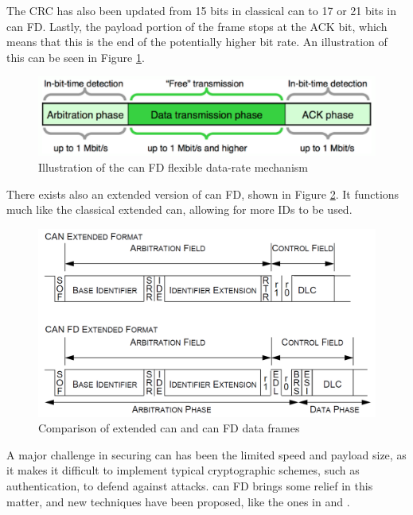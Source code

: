 The CRC has also been updated from 15 bits in classical \gls{can} to 17 or 21 bits in \gls{can} FD. Lastly, the payload portion of the frame stops at the ACK bit, which means that this is the end of the potentially higher bit rate. An illustration of this can be seen in Figure \ref{fig:CANFD_BitRates}.

\begin{figure}
    \centering
    \includegraphics[width = \textwidth]{img/parts/introduction/CAN FD Bit Rates.png}
    \caption{Illustration of the \gls{can} FD flexible data-rate mechanism \citep{CANFD}}
    \label{fig:CANFD_BitRates}
\end{figure}

There exists also an extended version of \gls{can} FD, shown in Figure \ref{fig:CANFD_Extended}. It functions much like the classical extended \gls{can}, allowing for more IDs to be used.

\begin{figure}
    \centering
    \includegraphics[width = \textwidth]{img/parts/introduction/CAN FD Extended.png}
    \caption{Comparison of extended \gls{can} and \gls{can} FD data frames \citep{Bosch2012}}
    \label{fig:CANFD_Extended}
\end{figure}

A major challenge in securing \gls{can} has been the limited speed and payload size, as it makes it difficult to implement typical cryptographic schemes, such as authentication, to defend against attacks. \gls{can} FD brings some relief in this matter, and new techniques have been proposed, like the ones in \citep{Woo2016} and \citep{Agrawal2019}.

